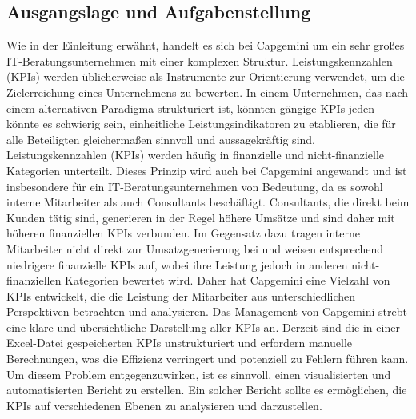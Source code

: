 \documentclass[a4paper, 12pt]{scrartcl}
\begin{document}
	\subsection{Ausgangslage und Aufgabenstellung}
Wie in der Einleitung erwähnt, handelt es sich bei Capgemini um ein sehr großes IT-Beratungsunternehmen mit einer komplexen Struktur. Leistungskennzahlen (KPIs) werden üblicherweise als Instrumente zur Orientierung verwendet, um die Zielerreichung eines Unternehmens zu bewerten. In einem Unternehmen, das nach einem alternativen Paradigma strukturiert ist, könnten gängige KPIs jeden könnte es schwierig sein, einheitliche Leistungsindikatoren zu etablieren, die für alle Beteiligten gleichermaßen sinnvoll und aussagekräftig sind\cite{aro2023using}.
\newline
Leistungskennzahlen (KPIs) werden häufig in finanzielle und nicht-finanzielle Kategorien unterteilt. Dieses Prinzip wird auch bei Capgemini angewandt und ist insbesondere für ein IT-Beratungsunternehmen von Bedeutung, da es sowohl interne Mitarbeiter als auch Consultants beschäftigt. Consultants, die direkt beim Kunden tätig sind, generieren in der Regel höhere Umsätze und sind daher mit höheren finanziellen KPIs verbunden. Im Gegensatz dazu tragen interne Mitarbeiter nicht direkt zur Umsatzgenerierung bei und weisen entsprechend niedrigere finanzielle KPIs auf, wobei ihre Leistung jedoch in anderen nicht-finanziellen Kategorien bewertet wird. Daher hat Capgemini eine Vielzahl von KPIs entwickelt, die die Leistung der Mitarbeiter aus unterschiedlichen Perspektiven betrachten und analysieren\cite{kald2000performance}.%
\newline
Das Management von Capgemini strebt eine klare und übersichtliche Darstellung aller KPIs an. Derzeit sind die in einer Excel-Datei gespeicherten KPIs unstrukturiert und erfordern manuelle Berechnungen, was die Effizienz verringert und potenziell zu Fehlern führen kann. Um diesem Problem entgegenzuwirken, ist es sinnvoll, einen visualisierten und automatisierten Bericht zu erstellen. Ein solcher Bericht sollte es ermöglichen, die KPIs auf verschiedenen Ebenen zu analysieren und darzustellen.
\end{document}
